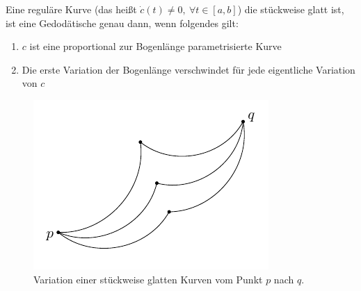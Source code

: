 \begin{satz}
    Eine reguläre Kurve (das heißt $\dot{c}(t)\neq 0, \ \forall t \in [a, b]$) die stückweise glatt ist, ist eine Gedodätische genau dann, wenn folgendes gilt:
    \begin{enumerate}
    \item $c$ ist eine proportional zur Bogenlänge parametrisierte Kurve
    \item Die erste Variation der Bogenlänge verschwindet für jede eigentliche Variation von $c$
    \end{enumerate}
    
\begin{figure}[H]
\centering
\includegraphics[width=0.4\linewidth]{figures/tikz/variationpiecewise.pdf}
\caption{Variation einer stückweise glatten Kurven vom Punkt $p$ nach $q$.}
\label{img:variationpiecewise}
\end{figure} 
\end{satz}
